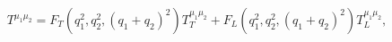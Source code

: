 \begin{equation}
T^{\mu_1 \mu_2} = F_T(q_1^2, q_2^2,(q_1+q_2)^2) T_T^{\mu_1 \mu_2} + F_L(q_1^2, q_2^2,(q_1+q_2)^2) T_L^{\mu_1 \mu_2},
\end{equation}

\begin{figure}[t] 
\centering
{} 

\end{figure}
